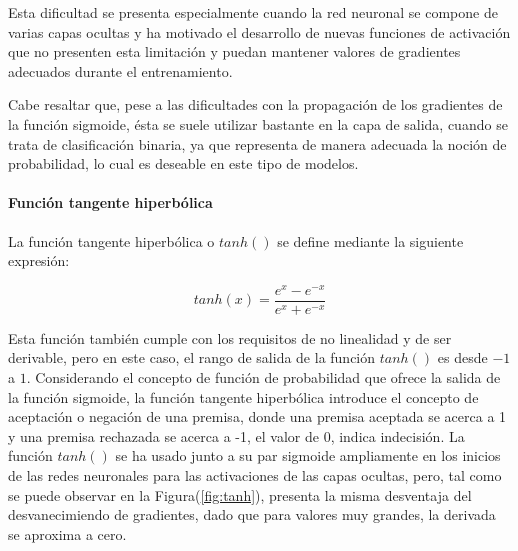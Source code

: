             Esta dificultad se presenta especialmente cuando la red neuronal se compone de varias capas ocultas y 
            ha motivado el desarrollo de nuevas funciones de activación que no presenten esta limitación y puedan 
            mantener valores de gradientes adecuados durante el entrenamiento.
            
            Cabe resaltar que, pese a las dificultades con la propagación de los gradientes de la función sigmoide, ésta se suele 
            utilizar bastante en la capa de salida, cuando se trata de clasificación binaria, ya que representa de manera adecuada
            la noción de probabilidad, lo cual es deseable en este tipo de modelos.

            \paragraph{Función tangente hiperbólica} \label{sec:tanh}
            La función tangente hiperbólica o $tanh()$ se define mediante la siguiente expresión:

            \begin{equation}\label{eq:tanh}
                tanh(x) = \frac{e^x - e^{-x}}{e^x + e^{-x}}
            \end{equation}

            Esta función también cumple con los requisitos de no linealidad y de ser derivable, pero en este caso, el rango de 
            salida de la función $tanh()$ es desde $-1$ a $1$. Considerando el concepto de función de probabilidad que ofrece 
            la salida de la función sigmoide, la función tangente hiperbólica introduce el concepto de aceptación o negación 
            de una premisa, donde una premisa aceptada se acerca a 1 y una premisa rechazada se acerca a -1, el valor de 0, 
            indica indecisión. La función $tanh()$ se ha usado junto a su par sigmoide ampliamente en los inicios de las redes 
            neuronales para las activaciones de las capas ocultas, pero, tal como se puede observar en la Figura(\ref{fig:tanh}), 
            presenta la misma desventaja del desvanecimiendo de gradientes, dado que para valores muy grandes, la derivada se 
            aproxima a cero.

